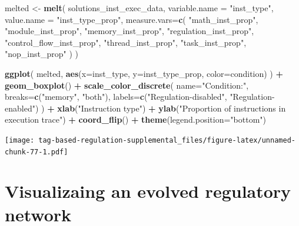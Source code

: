 \documentclass[
]{book}
\newenvironment{Shaded}{\begin{snugshade}}{\end{snugshade}}
\newcommand{\DataTypeTok}[1]{\textcolor[rgb]{0.13,0.29,0.53}{#1}}
\newcommand{\KeywordTok}[1]{\textcolor[rgb]{0.13,0.29,0.53}{\textbf{#1}}}
\newcommand{\NormalTok}[1]{#1}
\newcommand{\OperatorTok}[1]{\textcolor[rgb]{0.81,0.36,0.00}{\textbf{#1}}}
\newcommand{\StringTok}[1]{\textcolor[rgb]{0.31,0.60,0.02}{#1}}
\begin{document}
\begin{Shaded}
\begin{Highlighting}[]
\NormalTok{melted \textless{}{-}}\StringTok{ }\KeywordTok{melt}\NormalTok{(}
\NormalTok{  solutions\_inst\_exec\_data,}
  \DataTypeTok{variable.name =} \StringTok{"inst\_type"}\NormalTok{,}
  \DataTypeTok{value.name =} \StringTok{"inst\_type\_prop"}\NormalTok{,}
  \DataTypeTok{measure.vars=}\KeywordTok{c}\NormalTok{(}
    \StringTok{"math\_inst\_prop"}\NormalTok{,}
    \StringTok{"module\_inst\_prop"}\NormalTok{,}
    \StringTok{"memory\_inst\_prop"}\NormalTok{,}
    \StringTok{"regulation\_inst\_prop"}\NormalTok{,}
    \StringTok{"control\_flow\_inst\_prop"}\NormalTok{,}
    \StringTok{"thread\_inst\_prop"}\NormalTok{,}
    \StringTok{"task\_inst\_prop"}\NormalTok{,}
    \StringTok{"nop\_inst\_prop"}
\NormalTok{  )}
\NormalTok{)}

\KeywordTok{ggplot}\NormalTok{( melted, }\KeywordTok{aes}\NormalTok{(}\DataTypeTok{x=}\NormalTok{inst\_type, }\DataTypeTok{y=}\NormalTok{inst\_type\_prop, }\DataTypeTok{color=}\NormalTok{condition) ) }\OperatorTok{+}
\StringTok{  }\KeywordTok{geom\_boxplot}\NormalTok{() }\OperatorTok{+}
\StringTok{  }\KeywordTok{scale\_color\_discrete}\NormalTok{(}
    \DataTypeTok{name=}\StringTok{"Condition:"}\NormalTok{,}
    \DataTypeTok{breaks=}\KeywordTok{c}\NormalTok{(}\StringTok{"memory"}\NormalTok{, }\StringTok{"both"}\NormalTok{),}
    \DataTypeTok{labels=}\KeywordTok{c}\NormalTok{(}\StringTok{"Regulation{-}disabled"}\NormalTok{, }\StringTok{"Regulation{-}enabled"}\NormalTok{)}
\NormalTok{  ) }\OperatorTok{+}
\StringTok{  }\KeywordTok{xlab}\NormalTok{(}\StringTok{"Instruction type"}\NormalTok{) }\OperatorTok{+}
\StringTok{  }\KeywordTok{ylab}\NormalTok{(}\StringTok{"Proportion of instructions in execution trace"}\NormalTok{) }\OperatorTok{+}
\StringTok{  }\KeywordTok{coord\_flip}\NormalTok{() }\OperatorTok{+}
\StringTok{  }\KeywordTok{theme}\NormalTok{(}\DataTypeTok{legend.position=}\StringTok{"bottom"}\NormalTok{)}
\end{Highlighting}
\end{Shaded}

\texttt{[image: tag-based-regulation-supplemental\_files/figure-latex/unnamed-chunk-77-1.pdf]}

\hypertarget{visualizaing-an-evolved-regulatory-network}{%
\section{Visualizaing an evolved regulatory network}\label{visualizaing-an-evolved-regulatory-network}}
\end{document}
